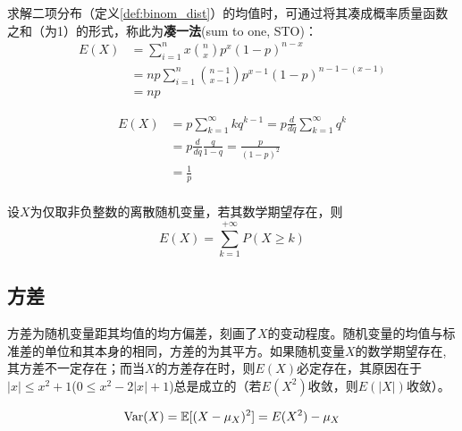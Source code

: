 \begin{example}[凑一法求解二项分布的均值]\label{ex:binom_dist_mean}
    求解二项分布（定义\ref{def:binom_dist}）的均值时，可通过将其凑成概率质量函数之和（为1）的形式，称此为\textbf{凑一法}(sum to one, STO)：
    \begin{align*}
        E(X) & =\sum_{i=1}^n x \binom{n}{x} p^x(1-p)^{n-x}                 \\
             & = np \sum_{i=1}^n \binom{n-1}{x-1} p^{x-1}(1-p)^{n-1-(x-1)} \\
             & =np
    \end{align*}
\end{example}

\begin{example}[微分法求解几何分布均值]\label{ex:geometric_dist_mean}
    \begin{align*}
        E(X) & =p\sum_{k=1}^{\infty}k q^{k-1}=p\frac{d}{d q}\sum_{k=1}^{\infty} q^{k} \\
             & =p\frac{d}{d q} \frac{q}{1-q} =\frac{p}{(1-p)^{2}}                     \\
             & =\frac{1}{p}                                                           \\
    \end{align*}
\end{example}

\begin{proposition}\label{prop:mean_of_non-negative_discrete_varible}
    设$X$为仅取非负整数的离散随机变量，若其数学期望存在，则
    \[ E(X) = \sum_{k=1}^{+\infty}P(X \ge k) \]
\end{proposition}

\subsection{方差}

方差为随机变量距其均值的均方偏差，刻画了$X$的变动程度。随机变量的均值与标准差的单位和其本身的相同，方差的为其平方。如果随机变量$X$的数学期望存在, 其方差不一定存在；而当$X$的方差存在时，则$E(X)$必定存在，其原因在于$|x| \le x^2+1$($0 \le x^2-2|x|+1$)总是成立的（若$E(X^2)$收敛，则$E(|X|)$收敛）。

\begin{proposition}
    \[ \operatorname{Var}(X)=\mathbb{E}[(X-\mu_X)^2]=E(X^2)-\mu_X \]
\end{proposition}

